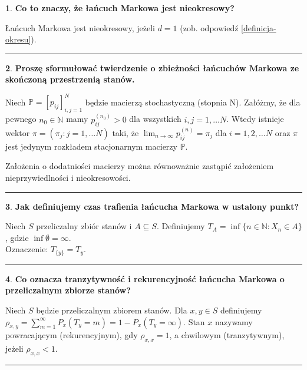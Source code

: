 \documentclass[
    twocolumn,
    twoside,
    fontsize=11pt,
    paper=A0,
    DIV=30
]{scrartcl}
\theoremstyle{definition}
\newtheorem{pytanie}{}
\theoremstyle{break}
\newenvironment{odpowiedź}{\vspace{-0.7em}}{\vspace{0.3em}\hrule}
\begin{document}
\begin{pytanie}
\textbf{Co to znaczy, że łańcuch Markowa jest nieokresowy?}
\end{pytanie}
\begin{odpowiedź}
    Łańcuch Markowa jest nieokresowy, jeżeli $d=1$
    (zob. odpowiedź \ref{definicja-okresu}).
\end{odpowiedź}


\begin{pytanie}
\textbf{Proszę sformułować twierdzenie o zbieżności łańcuchów Markowa ze skończoną przestrzenią stanów.}
\end{pytanie}
\begin{odpowiedź}
    Niech $\mathbb{P} = [p_{ij}]_{i,j=1}^N$
    będzie macierzą stochastyczną (stopnia  N).
    Załóżmy, że dla pewnego $n_0\in \mathbb{N}$
    mamy $p_{ij}^{(n_0)} > 0$ dla wszystkich $i, j=1, \ldots N$.
    Wtedy istnieje wektor $\pi = (\pi_j: j = 1, \ldots N)$
    taki, że $\lim_{n\to \infty}p^{(n)}_{ij} = \pi_j$ dla
    $i = 1, 2, \ldots N$ oraz $\pi$ jest jedynym rozkładem
    stacjonarnym macierzy $\mathbb{P}$.

    Założenia o dodatniości macierzy można równoważnie zastąpić
    założeniem nieprzywiedlności i nieokresowości.
\end{odpowiedź}


\begin{pytanie}
\textbf{Jak definiujemy czas trafienia łańcucha Markowa w ustalony punkt?}
\end{pytanie}
\begin{odpowiedź}
    Niech $S$ \pauza przeliczalny zbiór stanów i $A\subseteq S$.
    Definiujemy $T_A=\inf\{n\in \mathbb{N} : X_n\in A\}$,
    gdzie $\inf{\emptyset} = \infty$.\\
    Oznaczenie: $T_{\{y\}} = T_y$.
\end{odpowiedź}

\begin{pytanie}
\textbf{Co oznacza tranzytywność i rekurencyjność łańcucha Markowa o przeliczalnym zbiorze stanów?}
\end{pytanie}
\begin{odpowiedź}
    Niech $S$ będzie przeliczalnym zbiorem stanów.
    Dla $x, y \in S$ definiujemy
    $\rho_{x,y} = \sum_{m = 1}^\infty P_x(T_y = m) = 1 - P_x(T_y = \infty)$.
    Stan $x$ nazywamy powracającym (rekurencyjnym),
    gdy $\rho_{x,x} = 1$,
    a chwilowym (tranzytywnym), jeżeli $\rho_{x,x} < 1$.
\end{odpowiedź}
\end{document}
